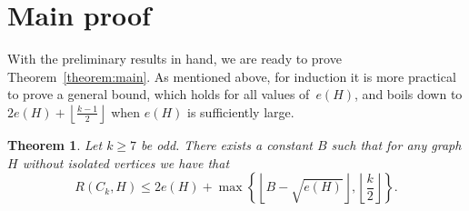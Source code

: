 \documentclass{article}
\newtheorem{theorem}{Theorem}
\newcommand*{\floorfrac}[2]{\mathopen{}\left\lfloor\frac{#1}{#2}\right\rfloor\mathclose{}}
\newcommand*{\bfloor}[1]{\left\lfloor #1\right\rfloor}
\begin{document}
\section{Main proof}\label{sec:mainproof}

With the preliminary results in hand, we are ready to prove Theorem~\ref{theorem:main}.
As mentioned above, for induction it is more practical to prove a general bound, which holds for all values of~$e(H)$, and boils down to $2e(H)+\floorfrac {k-1}2 $ when $e(H)$ is sufficiently large.

\begin{theorem}\label{thm:main+}
    Let $k \geq 7$ be odd. 
    There exists a constant $B$ such that for any graph $H$ without isolated vertices we have that
    \[
        R(C_k, H) \leq 2e(H) + \max\left\{  \bfloor{B - \sqrt{e(H)}}, \bfloor{\frac{k}{2}} \right\}.
    \]
\end{theorem}
\end{document}
